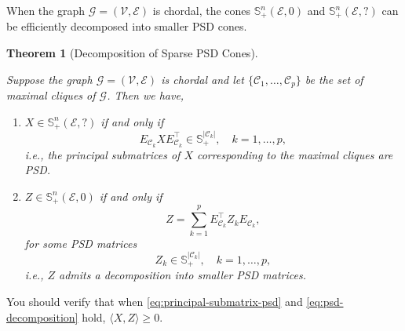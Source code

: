 \documentclass[
]{book}
\newtheorem{theorem}{Theorem}[chapter]
\theoremstyle{definition}
\theoremstyle{definition}
\theoremstyle{definition}
\theoremstyle{definition}
\theoremstyle{remark}
\begin{document}
When the graph \(\mathcal{G}= (\mathcal{V},\mathcal{E})\) is chordal, the cones \(\mathbb{S}^{n}_{+}(\mathcal{E},0)\) and \(\mathbb{S}^{n}_{+}(\mathcal{E},?)\) can be efficiently decomposed into smaller PSD cones.

\begin{theorem}[Decomposition of Sparse PSD Cones]
\protect\hypertarget{thm:DecomposeSparsePSDCones}{}\label{thm:DecomposeSparsePSDCones}

Suppose the graph \(\mathcal{G}= (\mathcal{V},\mathcal{E})\) is chordal and let \(\{ \mathcal{C}_1,\dots,\mathcal{C}_p \}\) be the set of maximal cliques of \(\mathcal{G}\). Then we have,

\begin{enumerate}
\def\labelenumi{\arabic{enumi}.}
\item
  \(X \in \mathbb{S}^{n}_{+}(\mathcal{E},?)\) if and only if
  \begin{equation}
  E_{\mathcal{C}_k} X E_{\mathcal{C}_k}^\top\in \mathbb{S}^{|\mathcal{C}_k|}_{+}, \quad k=1,\dots,p,
  \label{eq:principal-submatrix-psd}
  \end{equation}
  i.e., the principal submatrices of \(X\) corresponding to the maximal cliques are PSD.
\item
  \(Z \in \mathbb{S}^{n}_{+}(\mathcal{E},0)\) if and only if
  \begin{equation}
  Z = \sum_{k=1}^p E_{\mathcal{C}_k}^\top Z_k E_{\mathcal{C}_k}, 
  \label{eq:psd-decomposition}
  \end{equation}
  for some PSD matrices
  \[
  Z_k \in \mathbb{S}^{|\mathcal{C}_k|}_{+}, \quad k=1,\dots,p,
  \]
  i.e., \(Z\) admits a decomposition into smaller PSD matrices.
\end{enumerate}

\end{theorem}

You should verify that when \eqref{eq:principal-submatrix-psd} and \eqref{eq:psd-decomposition} hold, \(\langle X, Z \rangle\geq 0\).
\end{document}
